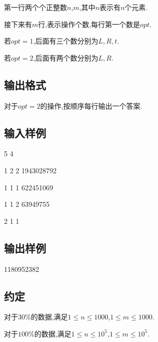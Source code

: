 \documentclass[]{article}
\begin{document}
第一行两个个正整数$n$,$m$,其中$n$表示有$n$个元素.

接下来有$m$行,表示操作个数,每行第一个数是$opt$.

若$opt=1$,后面有三个数分别为$L,R,t$.

若$opt=2$,后面有两个数分别为$L,R$.

\subsection{输出格式}

对于$opt=2$的操作,按顺序每行输出一个答案.

\subsection{输入样例}

5 4

1 2 2 1943028792

1 1 1 622451069

1 1 2 63949755

2 1 1

\subsection{输出样例}

1180952382

\subsection{约定}

对于$30\%$的数据,满足$1 \le n \le 1000$,$1 \le m \le 1000$.

对于$100\%$的数据,满足$1 \le n \le 10^5$,$1 \le m \le 10^5$.
\end{document}
